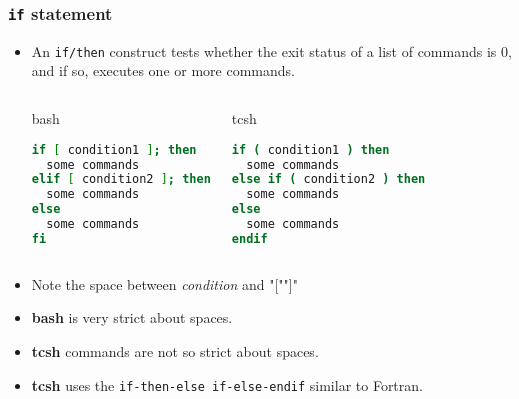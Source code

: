 \documentclass[slidestop,mathserif,compress,xcolor=svgnames]{beamer}
\newenvironment{bblock}[0]
{
\begin{beamerboxesrounded}[upper=uppercol1,lower=lowercol1,shadow=true]}
{\end{beamerboxesrounded}}
\newenvironment{eblock}[0]
{
\begin{beamerboxesrounded}[upper=uppercol2,lower=lowercol2,shadow=true]}
{\end{beamerboxesrounded}}
\begin{document}
\begin{frame}[fragile]
  \frametitle{\small \texttt{if} statement}
  \begin{itemize}
    \item An \texttt{if/then} construct tests whether the exit status of a list of commands is 0, and if so, executes one or more commands.
    \begin{columns}
      \column{5cm}
      \begin{eblock}{bash}
        \begin{lstlisting}[language=bash]
if [ condition1 ]; then
  some commands
elif [ condition2 ]; then
  some commands
else
  some commands
fi
        \end{lstlisting}
      \end{eblock}
      \column{5cm}
      \begin{bblock}{tcsh}
        \begin{lstlisting}[language=csh]
if ( condition1 ) then
  some commands
else if ( condition2 ) then
  some commands
else
  some commands
endif
        \end{lstlisting}
      \end{bblock}
    \end{columns}
  \item Note the space between \textit{condition} and "["\quad"]"
  \item \textbf{bash} is very strict about spaces.
  \item \textbf{tcsh} commands are not so strict about spaces.
  \item \textbf{tcsh} uses the \texttt{if-then-else if-else-endif} similar to Fortran.   
  \end{itemize}
\end{frame}
\end{document}
